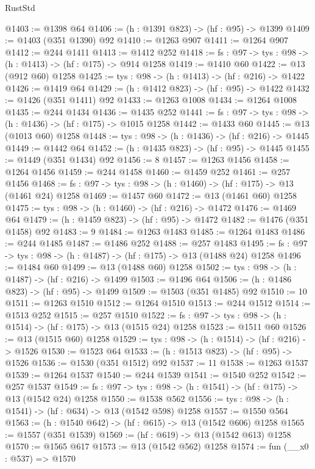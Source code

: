 \begin{lexlean}{RustStd}
\begin{coremodule}
@1403 := @1398 @64
@1406 := (h : @1391 @823) -> (hf : @95) -> @1399
@1409 := @1403 (@351 @1390) @92
@1410 := @1263 @907
@1411 := @1264 @907
@1412 := @244 @1411
@1413 := @1412 @252
@1418 := {fs : @97} -> {tys : @98} -> (h : @1413) -> (hf : @175) -> @914 @1258
@1419 := @1410 @60
@1422 := @13 (@912 @60) @1258
@1425 := {tys : @98} -> (h : @1413) -> (hf : @216) -> @1422
@1426 := @1419 @64
@1429 := (h : @1412 @823) -> (hf : @95) -> @1422
@1432 := @1426 (@351 @1411) @92
@1433 := @1263 @1008
@1434 := @1264 @1008
@1435 := @244 @1434
@1436 := @1435 @252
@1441 := {fs : @97} -> {tys : @98} -> (h : @1436) -> (hf : @175) -> @1015 @1258
@1442 := @1433 @60
@1445 := @13 (@1013 @60) @1258
@1448 := {tys : @98} -> (h : @1436) -> (hf : @216) -> @1445
@1449 := @1442 @64
@1452 := (h : @1435 @823) -> (hf : @95) -> @1445
@1455 := @1449 (@351 @1434) @92
@1456 := 8
@1457 := @1263 @1456
@1458 := @1264 @1456
@1459 := @244 @1458
@1460 := @1459 @252
@1461 := @257 @1456
@1468 := {fs : @97} -> {tys : @98} -> (h : @1460) -> (hf : @175) -> @13 (@1461 @24) @1258
@1469 := @1457 @60
@1472 := @13 (@1461 @60) @1258
@1475 := {tys : @98} -> (h : @1460) -> (hf : @216) -> @1472
@1476 := @1469 @64
@1479 := (h : @1459 @823) -> (hf : @95) -> @1472
@1482 := @1476 (@351 @1458) @92
@1483 := 9
@1484 := @1263 @1483
@1485 := @1264 @1483
@1486 := @244 @1485
@1487 := @1486 @252
@1488 := @257 @1483
@1495 := {fs : @97} -> {tys : @98} -> (h : @1487) -> (hf : @175) -> @13 (@1488 @24) @1258
@1496 := @1484 @60
@1499 := @13 (@1488 @60) @1258
@1502 := {tys : @98} -> (h : @1487) -> (hf : @216) -> @1499
@1503 := @1496 @64
@1506 := (h : @1486 @823) -> (hf : @95) -> @1499
@1509 := @1503 (@351 @1485) @92
@1510 := 10
@1511 := @1263 @1510
@1512 := @1264 @1510
@1513 := @244 @1512
@1514 := @1513 @252
@1515 := @257 @1510
@1522 := {fs : @97} -> {tys : @98} -> (h : @1514) -> (hf : @175) -> @13 (@1515 @24) @1258
@1523 := @1511 @60
@1526 := @13 (@1515 @60) @1258
@1529 := {tys : @98} -> (h : @1514) -> (hf : @216) -> @1526
@1530 := @1523 @64
@1533 := (h : @1513 @823) -> (hf : @95) -> @1526
@1536 := @1530 (@351 @1512) @92
@1537 := 11
@1538 := @1263 @1537
@1539 := @1264 @1537
@1540 := @244 @1539
@1541 := @1540 @252
@1542 := @257 @1537
@1549 := {fs : @97} -> {tys : @98} -> (h : @1541) -> (hf : @175) -> @13 (@1542 @24) @1258
@1550 := @1538 @562
@1556 := {tys : @98} -> (h : @1541) -> (hf : @634) -> @13 (@1542 @598) @1258
@1557 := @1550 @564
@1563 := (h : @1540 @642) -> (hf : @615) -> @13 (@1542 @606) @1258
@1565 := @1557 (@351 @1539)
@1569 := (hf : @619) -> @13 (@1542 @613) @1258
@1570 := @1565 @617
@1573 := @13 (@1542 @562) @1258
@1574 := fun (__x0 : @537) => @1570

\end{coremodule}
\end{lexlean}
